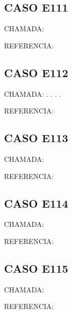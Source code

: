 \documentclass{undftex}
\begin{document}
\begin{refsection}\section*{CASO E111}\noindent CHAMADA:  \par\noindent REFERENCIA:\par\printbibliography[heading=none,check=undfconsultadas]\end{refsection}\clearpage
\begin{refsection}\section*{CASO E112}\noindent CHAMADA: . . . .\par\noindent REFERENCIA:\par\printbibliography[heading=none,check=undfconsultadas]\end{refsection}\clearpage
\begin{refsection}\section*{CASO E113}\noindent CHAMADA:  \par\noindent REFERENCIA:\par\printbibliography[heading=none,check=undfconsultadas]\end{refsection}\clearpage
\begin{refsection}\section*{CASO E114}\noindent CHAMADA:  \par\noindent REFERENCIA:\par\printbibliography[heading=none,check=undfconsultadas]\end{refsection}\clearpage
\begin{refsection}\section*{CASO E115}\noindent CHAMADA:  \par\noindent REFERENCIA:\par\printbibliography[heading=none,check=undfconsultadas]\end{refsection}\clearpage
\end{document}
